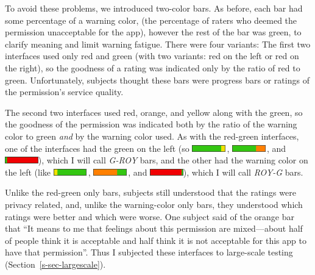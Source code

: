 \documentclass[11pt]{article}
\newcommand{\refsec}[1]{Section~\ref{#1}}
\begin{document}
To avoid these problems, we
introduced two-color bars. As before, each bar had some percentage of 
a warning color, (the percentage of raters who deemed the permission
unacceptable for the app), however the rest of the
bar was green, to clarify meaning and limit warning fatigue.
There were four variants:
\label{ss-sec-pbars-r4}
The first two interfaces used only red 
and green (with two variants: red on the left or red on the right),
so the goodness of a rating was indicated only by the ratio of red to green.
Unfortunately, subjects thought these bars were
progress bars or ratings of the 
permission's service quality.

The second two interfaces used red, orange, and yellow 
along with the green, so the goodness of the permission
was indicated both by the ratio of the warning color to green \emph{and} by the warning color
used. As with the red-green interfaces, one of the interfaces had the green on the left (so 
\includegraphics[height=8pt]{img/Bars4/RedYellowGreen/GreenYellowBar.png}\,,
\includegraphics[height=8pt]{img/Bars4/RedYellowGreen/GreenOrangeBar.png}\,, and 
\includegraphics[height=8pt]{img/Bars4/RedYellowGreen/GreenRedBar.png}),
which I will call \emph{G-ROY} bars, and the
other had the warning color on the left (like 
\includegraphics[height=8pt]{img/Bars4/RedYellowGreen/YellowGreenBar.png}\,,
\includegraphics[height=8pt]{img/Bars4/RedYellowGreen/OrangeGreenBar.png}\,, and
\includegraphics[height=8pt]{img/Bars4/RedYellowGreen/RedGreenBar.png}),
which I will call \emph{ROY-G} bars.


Unlike the red-green only
bars, subjects still understood that the ratings were privacy related, and, 
unlike the warning-color only bars, 
they understood which ratings were better and which were worse. One subject
said of the orange bar that ``It means to me that feelings about 
this permission are mixed---about half of people think 
it is acceptable and half think it is not 
acceptable for this app to have that permission''. Thus I 
subjected these interfaces to large-scale testing (\refsec{s-sec-largescale}). 
\end{document}
